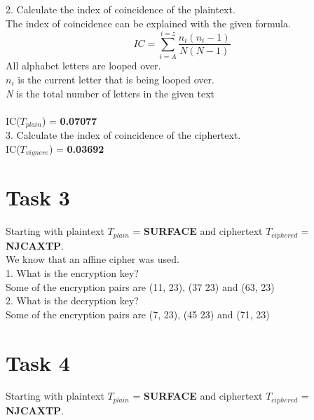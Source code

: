 \documentclass{article}
\begin{document}
2. Calculate the index of coincidence of the plaintext.\\
The index of coincidence can be explained with the given formula.
\[ IC = \sum_{i=A}^{i=z} \frac{n_i(n_i -1)}{N(N - 1)} \]
All alphabet letters are looped over. \\
\textit{$n_i$} is the current letter that is being looped over.\\
\textit{N} is the total number of letters in the given text\\\\
IC(\textit{$T_{plain}$}) = \textbf{0.07077}
\\

3. Calculate the index of coincidence of the ciphertext.\\
IC(\textit{$T_{vignere}$}) = \textbf{0.03692}



\section{Task 3}
Starting with plaintext \textit{$T_{plain}$} = \textbf{SURFACE} and ciphertext \textit{$T_{ciphered}$} = \textbf{NJCAXTP}. \\
We know that an affine cipher was used.\\

1. What is the encryption key?\\
Some of the encryption pairs are (11, 23), (37 23) and (63, 23)\\


2. What is the decryption key?\\
Some of the encryption pairs are (7, 23), (45 23) and (71, 23)\\





\section{Task 4}
Starting with plaintext \textit{$T_{plain}$} = \textbf{SURFACE} and ciphertext \textit{$T_{ciphered}$} = \textbf{NJCAXTP}. \\




\end{document}

